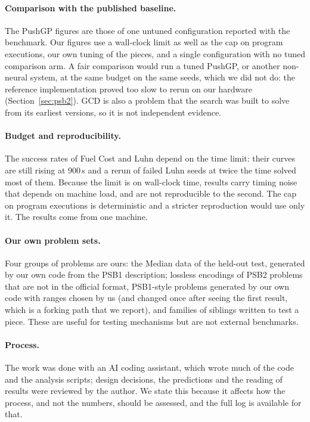 \documentclass[sigconf,nonacm]{acmart}
\begin{document}
\paragraph{Comparison with the published baseline.}
The PushGP figures are those of one untuned configuration reported with the benchmark. Our figures use a wall-clock limit as well as the cap on program
executions, our own tuning of the pieces, and a single configuration with no tuned comparison arm. A fair comparison would run a tuned PushGP, or another
non-neural system, at the same budget on the same seeds, which we did not do: the reference implementation proved too slow to rerun on our hardware (Section~\ref{sec:psb2}). GCD is also a problem that the search was built to solve from its earliest versions, so it is not independent evidence.

\paragraph{Budget and reproducibility.}
The success rates of Fuel Cost and Luhn depend on the time limit: their curves are still rising at 900\,s and a rerun of failed Luhn seeds at twice the time solved most of them. Because the limit is on wall-clock time, results
carry timing noise that depends on machine load, and are not reproducible to the second. The cap on program executions is deterministic and a stricter
reproduction would use only it. The results come from one machine.

\paragraph{Our own problem sets.}
Four groups of problems are ours: the Median data of the held-out test, generated by our own code from the PSB1 description; lossless encodings of PSB2 problems that are not in the official format, PSB1-style problems generated by our own code with ranges chosen by us (and
changed once after seeing the first result, which is a forking path that we report), and families of siblings written to test a piece. These are useful for
testing mechanisms but are not external benchmarks.

\paragraph{Process.}
The work was done with an AI coding assistant, which wrote much of the code and the analysis scripts; design decisions, the predictions and the reading of results were reviewed by the
author. We state this because it affects how the process, and not the numbers, should be assessed, and the full log is available for that.
\end{document}
